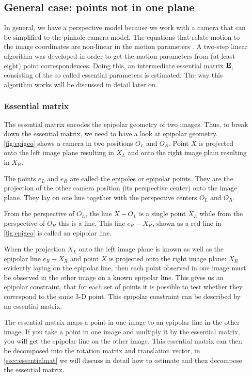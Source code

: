 \subsection{General case: points not in one plane}
In general, we have a perspective model because we work with a camera that can be simplified to the pinhole camera model. The equations that relate motion to the image coordinates are non-linear in the motion parameters \cite{tekalp}. A two-step linear algorithm was developed in order to get the motion parameters from (at least eight) point correspondences. Doing this, an intermediate essential matrix $\mathbf{E}$, consisting of the so called essential parameters is estimated. The way this algorithm works will be discussed in detail later on.

\subsubsection{Essential matrix}
The essential matrix encodes the epipolar geometry of two images. Thus, to break down the essential matrix, we need to have a look at epipolar geometry. \autoref{fig:epigeo} shows a camera in two positions $O_L$ and $O_R$. Point $X$ is projected onto the left image plane resulting in $X_L$ and onto the right image plain resulting in $X_R$.\bigskip

The points $e_L$ and $e_R$ are called the epipoles or epipolar points. They are the projection of the other camera position (its perspective center) onto the image plane. They lay on one line together with the perspective centers $O_L$ and $O_R$.\bigskip

From the perspective of $O_L$, the line $X-O_L$ is a single point $X_L$ while from the perspective of $O_R$ this is a line. This line $e_R-X_R$, shown as a red line in \autoref{fig:epigeo} is called an epipolar line.\bigskip

When the projection $X_L$ onto the left image plane is known as well as the epipolar line $e_R-X_R$ and point $X$ is projected onto the right image plane: $X_R$ evidently laying on the epipolar line, then each point observed in one image must be observed in the other image on a known epipolar line. This gives us an epipolar constraint, that for each set of points it is possible to test whether they correspond to the same 3-D point. This epipolar constraint can be described by an essential matrix.\bigskip

The essential matrix maps a point in one image to an epipolar line in the other image. If you take a point in one image and multiply it by the essential matrix, you will get the epipolar line on the other image. This essential matrix can then be decomposed into the rotation matrix and translation vector, in \autoref{ssec:essentialmat} we will discuss in detail how to estimate and then decompose the essential matrix.

